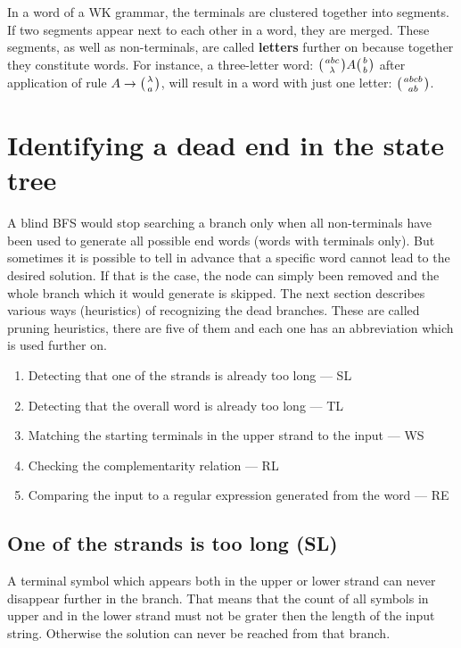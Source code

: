 In a word of a WK grammar, the terminals are clustered together into segments. If two segments appear next to each other in a word, they are merged. These segments, as well as non-terminals, are called \textbf{letters} further on because together they constitute words. For instance, a three-letter word: $\wkpair{abc}{\lambda} A \wkpair{b}{b}$ after application of rule $A \rightarrow \wkpair{\lambda}{a}$, will result in a word with just one letter: $\wkpair{abcb}{ab}$.

\section{Identifying a dead end in the state tree}
A blind BFS would stop searching a branch only when all non-terminals have been used to generate all possible end words (words with terminals only). But sometimes it is possible to tell in advance that a specific word cannot lead to the desired solution. If that is the case, the node can simply been removed and the whole branch which it would generate is skipped. The next section describes various ways (heuristics) of recognizing the dead branches. These are called pruning heuristics, there are five of them and each one has an abbreviation which is used further on.

\begin{enumerate}
  \item{Detecting that one of the strands is already too long --- SL}
  \item{Detecting that the overall word is already too long --- TL}
  \item{Matching the starting terminals in the upper strand to the input --- WS}
  \item{Checking the complementarity relation --- RL}
  \item{Comparing the input to a regular expression generated from the word --- RE}
\end{enumerate}


\subsection{One of the strands is too long (SL)}
A terminal symbol which appears both in the upper or lower strand can never disappear further in the branch. That means that the count of all symbols in upper and in the lower strand must not be grater then the length of the input string. Otherwise the solution can never be reached from that branch.

